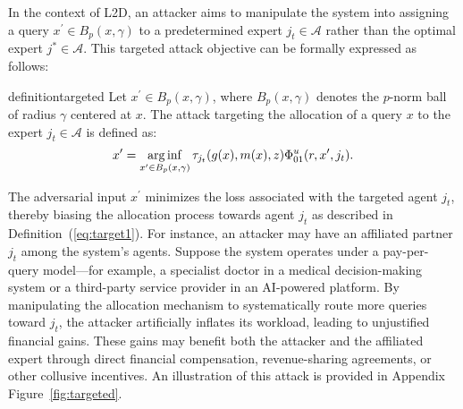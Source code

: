 In the context of L2D, an attacker aims to manipulate the system into assigning a query \( x^\prime \in B_p(x, \gamma) \) to a predetermined expert \( j_t \in \mathcal{A} \) rather than the optimal expert \( j^\ast \in \mathcal{A} \). This targeted attack objective can be formally expressed as follows:

\begin{restatable}{definition}{targeted}\label{eq:target1}
Let \(x^\prime \in B_p(x, \gamma)\), where \(B_p(x, \gamma)\) denotes the \(p\)-norm ball of radius \(\gamma\) centered at \(x\). The attack targeting the allocation of a query \( x \) to the expert \( j_t \in \mathcal{A} \) is defined as:
\begin{equation*}
    x^\prime = \operatorname*{arg\,inf}_{x^\prime \in B_p(x,\gamma)} \tau_{j_t}(g(x), m(x), z) \Phi_{01}^u(r, x^\prime, j_t).
\end{equation*}
\end{restatable}
The adversarial input \( x^\prime \) minimizes the loss associated with the targeted agent \( j_t \), thereby biasing the allocation process towards agent $j_t$ as described in Definition~(\ref{eq:target1}).  For instance, an attacker may have an affiliated partner \( j_t \) among the system’s agents. Suppose the system operates under a pay-per-query model—for example, a specialist doctor in a medical decision-making system or a third-party service provider in an AI-powered platform. By manipulating the allocation mechanism to systematically route more queries toward \( j_t \), the attacker artificially inflates its workload, leading to unjustified financial gains. These gains may benefit both the attacker and the affiliated expert through direct financial compensation, revenue-sharing agreements, or other collusive incentives. An illustration of this attack is provided in Appendix Figure~\ref{fig:targeted}.








